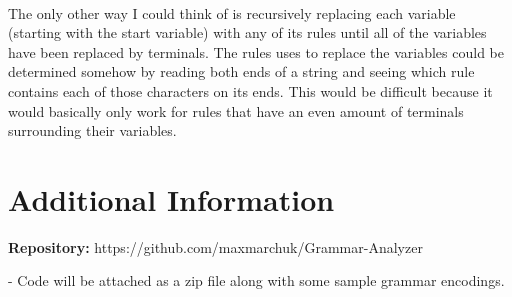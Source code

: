 \documentclass[11pt]{article}
\begin{document}
\begin{enumerate}
        \paragraph{}The only other way I could think of is recursively replacing each variable (starting with the start variable) with any of its rules until all of the variables have been replaced by terminals. The rules uses to replace the variables could be determined somehow by reading both ends of a string and seeing which rule contains each of those characters on its ends. This would be difficult because it would basically only work for rules that have an even amount of terminals surrounding their variables.
    \end{enumerate}

\section*{Additional Information}


\textbf{Repository:} https://github.com/maxmarchuk/Grammar-Analyzer

- Code will be attached as a zip file along with some sample grammar encodings. 
\end{document}
